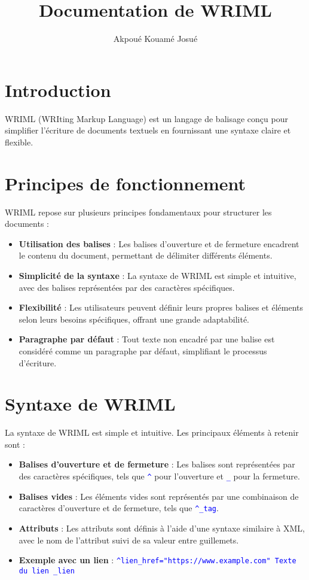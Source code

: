 \documentclass{article}
\title{Documentation de WRIML}
\author{Akpoué Kouamé Josué}
\date{\displaydate{todaydate}}
\newcommand{\wriml}[1]{\textcolor{blue}{\texttt{#1}}}
\begin{document}
\maketitle

\section{Introduction}
WRIML (WRIting Markup Language) est un langage de balisage conçu pour simplifier l'écriture de documents textuels en fournissant une syntaxe claire et flexible.

\section{Principes de fonctionnement}
WRIML repose sur plusieurs principes fondamentaux pour structurer les documents :

\begin{itemize}
    \item \textbf{Utilisation des balises} : Les balises d'ouverture et de fermeture encadrent le contenu du document, permettant de délimiter différents éléments.
    \item \textbf{Simplicité de la syntaxe} : La syntaxe de WRIML est simple et intuitive, avec des balises représentées par des caractères spécifiques.
    \item \textbf{Flexibilité} : Les utilisateurs peuvent définir leurs propres balises et éléments selon leurs besoins spécifiques, offrant une grande adaptabilité.
    \item \textbf{Paragraphe par défaut} : Tout texte non encadré par une balise est considéré comme un paragraphe par défaut, simplifiant le processus d'écriture.
\end{itemize}

\section{Syntaxe de WRIML}
La syntaxe de WRIML est simple et intuitive. Les principaux éléments à retenir sont :

\begin{itemize}
    \item \textbf{Balises d'ouverture et de fermeture} : Les balises sont représentées par des caractères spécifiques, tels que \wriml{\textasciicircum} pour l'ouverture et \wriml{\_} pour la fermeture.
    \item \textbf{Balises vides} : Les éléments vides sont représentés par une combinaison de caractères d'ouverture et de fermeture, tels que \wriml{\textasciicircum\_tag}.
    \item \textbf{Attributs} : Les attributs sont définis à l'aide d'une syntaxe similaire à XML, avec le nom de l'attribut suivi de sa valeur entre guillemets.
    \item \textbf{Exemple avec un lien} : \wriml{\textasciicircum lien\_href="https://www.example.com" Texte du lien \_lien}
\end{itemize}
\end{document}
